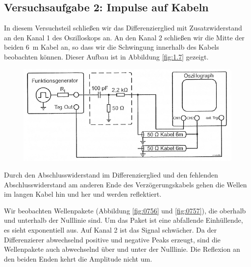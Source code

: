 \FloatBarrier
\subsection{Versuchsaufgabe 2: Impulse auf Kabeln}

In diesem Versuchsteil schließen wir das Differenzierglied mit Zusatzwiderstand
an den Kanal 1 des Oszilloskops an. An den Kanal 2 schließen wir die Mitte der
beiden \SI{6}{\meter} Kabel an, so dass wir die Schwingung innerhalb des Kabels
beobachten können. Dieser Aufbau ist in Abbildung \ref{fig:1.7} gezeigt.

\begin{figure}
	\centering
	\includegraphics[width=\textwidth]{Schaltplan/1-7.png}
	\caption{%
		\cite[Abbildung~1.7]{physik313-Anleitung}
	}
	\label{fig:1-7}
\end{figure}

Durch den Abschlusswiderstand im Differenzierglied und den
fehlenden Abschlusswiderstand am anderen Ende des Verzögerungskabels gehen die
Wellen im langen Kabel hin und her und werden reflektiert.

Wir beobachten Wellenpakete (Abbildung \ref{fig:0756} und \ref{fig:0757}), die
oberhalb und unterhalb der Nulllinie sind. Um das Paket ist eine abfallende
Einhüllende, es sieht exponentiell aus. Auf Kanal 2 ist das Signal schwächer.
Da der Differenzierer abwechselnd positive und negative Peaks erzeugt, sind die
Wellenpakete auch abwechselnd über und unter der Nulllinie. Die Reflexion an
den beiden Enden kehrt die Amplitude nicht um.

